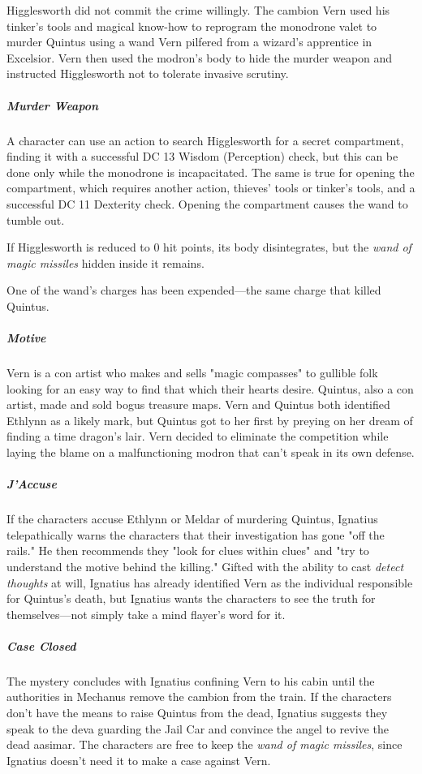 \documentclass[10pt,a4paper,twoside,bg=print,twocolumn,openany,nodeprecatedcode]{dndarticle}
\begin{document}
Higglesworth did not commit the crime willingly. The cambion Vern used his tinker's tools and magical know-how to reprogram the monodrone valet to murder Quintus using a wand Vern pilfered from a wizard's apprentice in Excelsior. Vern then used the modron's body to hide the murder weapon and instructed Higglesworth not to tolerate invasive scrutiny.

\subparagraph{Murder Weapon}
A character can use an action to search Higglesworth for a secret compartment, finding it with a successful DC 13 Wisdom (Perception) check, but this can be done only while the monodrone is incapacitated. The same is true for opening the compartment, which requires another action, thieves' tools or tinker's tools, and a successful DC 11 Dexterity check. Opening the compartment causes the wand to tumble out.

If Higglesworth is reduced to 0 hit points, its body disintegrates, but the \textit{wand of magic missiles} hidden inside it remains.

One of the wand's charges has been expended—the same charge that killed Quintus.

\subparagraph{Motive}
Vern is a con artist who makes and sells "magic compasses" to gullible folk looking for an easy way to find that which their hearts desire. Quintus, also a con artist, made and sold bogus treasure maps. Vern and Quintus both identified Ethlynn as a likely mark, but Quintus got to her first by preying on her dream of finding a time dragon's lair. Vern decided to eliminate the competition while laying the blame on a malfunctioning modron that can't speak in its own defense.

\subparagraph{J'Accuse}
If the characters accuse Ethlynn or Meldar of murdering Quintus, Ignatius telepathically warns the characters that their investigation has gone "off the rails." He then recommends they "look for clues within clues" and "try to understand the motive behind the killing." Gifted with the ability to cast \textit{detect thoughts} at will, Ignatius has already identified Vern as the individual responsible for Quintus's death, but Ignatius wants the characters to see the truth for themselves—not simply take a mind flayer's word for it.

\subparagraph{Case Closed}
The mystery concludes with Ignatius confining Vern to his cabin until the authorities in Mechanus remove the cambion from the train. If the characters don't have the means to raise Quintus from the dead, Ignatius suggests they speak to the deva guarding the Jail Car and convince the angel to revive the dead aasimar. The characters are free to keep the \textit{wand of magic missiles}, since Ignatius doesn't need it to make a case against Vern.
\end{document}
